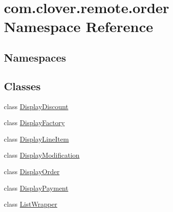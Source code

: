 \hypertarget{namespacecom_1_1clover_1_1remote_1_1order}{}\section{com.\+clover.\+remote.\+order Namespace Reference}
\label{namespacecom_1_1clover_1_1remote_1_1order}
\subsection*{Namespaces}
\begin{DoxyCompactItemize}
\end{DoxyCompactItemize}
\subsection*{Classes}
\begin{DoxyCompactItemize}
\item 
class \hyperlink{classcom_1_1clover_1_1remote_1_1order_1_1_display_discount}{Display\+Discount}
\item 
class \hyperlink{classcom_1_1clover_1_1remote_1_1order_1_1_display_factory}{Display\+Factory}
\item 
class \hyperlink{classcom_1_1clover_1_1remote_1_1order_1_1_display_line_item}{Display\+Line\+Item}
\item 
class \hyperlink{classcom_1_1clover_1_1remote_1_1order_1_1_display_modification}{Display\+Modification}
\item 
class \hyperlink{classcom_1_1clover_1_1remote_1_1order_1_1_display_order}{Display\+Order}
\item 
class \hyperlink{classcom_1_1clover_1_1remote_1_1order_1_1_display_payment}{Display\+Payment}
\item 
class \hyperlink{classcom_1_1clover_1_1remote_1_1order_1_1_list_wrapper}{List\+Wrapper}
\end{DoxyCompactItemize}
